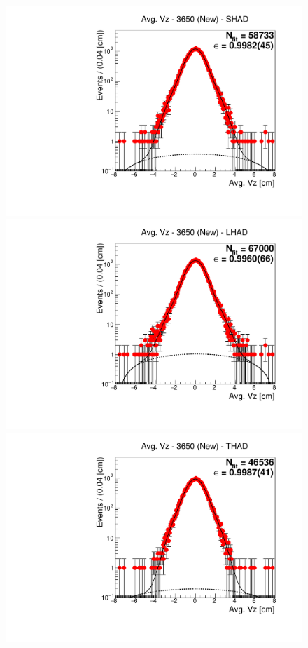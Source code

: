\begin{figure}[H]
\centering
\includegraphics[scale=0.25]{figures/plots/nonDDbar_fit_results/3650_new/fit_new_3650_data_SHAD.pdf}
\hspace{-0.5cm}
\includegraphics[scale=0.25]{figures/plots/nonDDbar_fit_results/3650_new/fit_new_3650_data_LHAD.pdf}
\hspace{-0.5cm}
\includegraphics[scale=0.25]{figures/plots/nonDDbar_fit_results/3650_new/fit_new_3650_data_THAD.pdf}

\end{figure}
